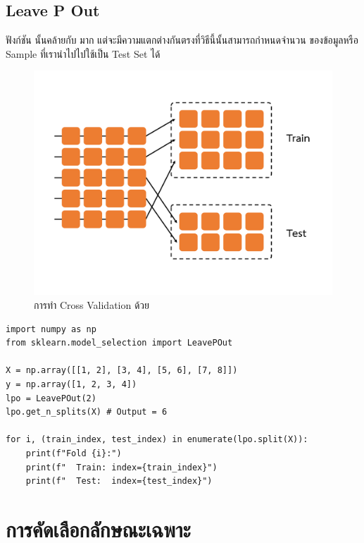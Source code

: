 \subsection{Leave P Out}
\label{ssec:leave_p_out}

ฟังก์ชัน  นั้นคล้ายกับ  มาก แต่จะมีความแตกต่างกันตรงที่วิธีนี้นั้นสามารถกำหนดจำนวน%
ของข้อมูลหรือ Sample ที่เรานำไปไปใช้เป็น Test Set ได้

\begin{figure}[H]
    \centering
    \includegraphics[width=0.9\linewidth,page=6]{fig/cross_validation.pdf}
    \caption{การทำ Cross Validation ด้วย }
    \label{fig:leave_p_out}
\end{figure}

\begin{lstlisting}[style=MyPython]
import numpy as np
from sklearn.model_selection import LeavePOut

X = np.array([[1, 2], [3, 4], [5, 6], [7, 8]])
y = np.array([1, 2, 3, 4])
lpo = LeavePOut(2)
lpo.get_n_splits(X) # Output = 6

for i, (train_index, test_index) in enumerate(lpo.split(X)):
    print(f"Fold {i}:")
    print(f"  Train: index={train_index}")
    print(f"  Test:  index={test_index}")
\end{lstlisting}

\section{การคัดเลือกลักษณะเฉพาะ}
\label{sec:select_feat}

